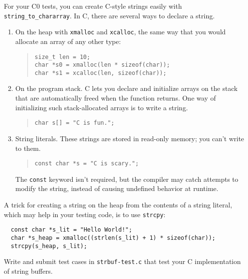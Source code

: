 \documentclass[12pt]{exam}
\begin{document}
For your C0 tests, you can create C-style strings easily with
\lstinline'string_to_chararray'. In C, there are several ways to
declare a string.

\begin{enumerate}
\item%
  On the heap with \lstinline'xmalloc' and \lstinline'xcalloc', the
  same way that you would allocate an array of any other type:
\begin{quote}
\begin{lstlisting}
size_t len = 10;
char *s0 = xmalloc(len * sizeof(char));
char *s1 = xcalloc(len, sizeof(char));
\end{lstlisting}
\end{quote}
\item%
  On the program stack. C lets you declare and initialize arrays on
  the stack that are automatically freed when the function
  returns. One way of initializing such stack-allocated arrays is to
  write a string.
\begin{quote}
\begin{lstlisting}
char s[] = "C is fun.";
\end{lstlisting}
\end{quote}
\item%
  String literals. These strings are stored in read-only memory; you
  can't write to them.
\begin{quote}
\begin{lstlisting}
const char *s = "C is scary.";
\end{lstlisting}
\end{quote}
  The \lstinline'const' keyword isn't required, but the compiler may catch
  attempts to modify the string, instead of causing undefined behavior
  at runtime.
\end{enumerate}
A trick for creating a string on the heap from the contents of a
string literal, which may help in your testing code, is to use
\lstinline"strcpy":
\begin{lstlisting}
  const char *s_lit = "Hello World!";
  char *s_heap = xmalloc((strlen(s_lit) + 1) * sizeof(char));
  strcpy(s_heap, s_lit);
\end{lstlisting}

\begin{task}[2]
  Write and submit test cases in \lstinline'strbuf-test.c' that test
  your C implementation of string buffers.
\end{task}
\end{document}
